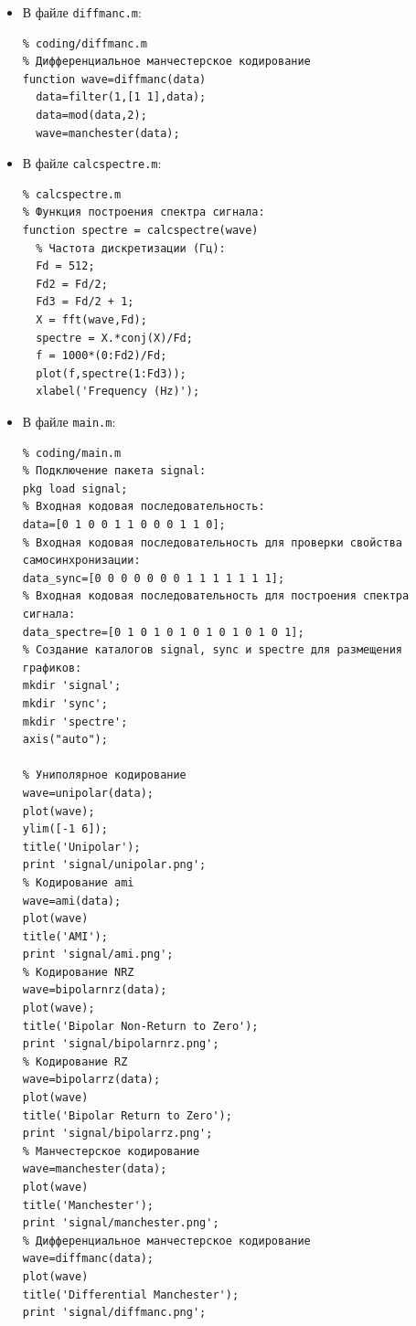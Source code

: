 \begin{enumerate}
\begin{itemize}
\begin{verbatim}
% coding/manchester.m
% Манчестерское кодирование:
function wave=manchester(data)
  data(data==0)=-1;
  data=upsample(data,2);
  data=filter([-1 1],1,data);
  wave=maptowave(data);
            \end{verbatim}
        \item В файле \texttt{diffmanc.m}:
            \begin{verbatim}
% coding/diffmanc.m
% Дифференциальное манчестерское кодирование
function wave=diffmanc(data)
  data=filter(1,[1 1],data);
  data=mod(data,2);
  wave=manchester(data);
            \end{verbatim}
        \item В файле \texttt{calcspectre.m}:
            \begin{verbatim}
% calcspectre.m
% Функция построения спектра сигнала:
function spectre = calcspectre(wave)
  % Частота дискретизации (Гц):
  Fd = 512;
  Fd2 = Fd/2;
  Fd3 = Fd/2 + 1;
  X = fft(wave,Fd);
  spectre = X.*conj(X)/Fd;
  f = 1000*(0:Fd2)/Fd;
  plot(f,spectre(1:Fd3));
  xlabel('Frequency (Hz)');
            \end{verbatim}
        \item В файле \texttt{main.m}:
            \begin{verbatim}
% coding/main.m
% Подключение пакета signal:
pkg load signal;
% Входная кодовая последовательность:
data=[0 1 0 0 1 1 0 0 0 1 1 0];
% Входная кодовая последовательность для проверки свойства самосинхронизации:
data_sync=[0 0 0 0 0 0 0 1 1 1 1 1 1 1];
% Входная кодовая последовательность для построения спектра сигнала:
data_spectre=[0 1 0 1 0 1 0 1 0 1 0 1 0 1];
% Создание каталогов signal, sync и spectre для размещения графиков:
mkdir 'signal';
mkdir 'sync';
mkdir 'spectre';
axis("auto");

% Униполярное кодирование
wave=unipolar(data);
plot(wave);
ylim([-1 6]);
title('Unipolar');
print 'signal/unipolar.png';
% Кодирование ami
wave=ami(data);
plot(wave)
title('AMI');
print 'signal/ami.png';
% Кодирование NRZ
wave=bipolarnrz(data);
plot(wave);
title('Bipolar Non-Return to Zero');
print 'signal/bipolarnrz.png';
% Кодирование RZ
wave=bipolarrz(data);
plot(wave)
title('Bipolar Return to Zero');
print 'signal/bipolarrz.png';
% Манчестерское кодирование
wave=manchester(data);
plot(wave)
title('Manchester');
print 'signal/manchester.png';
% Дифференциальное манчестерское кодирование
wave=diffmanc(data);
plot(wave)
title('Differential Manchester');
print 'signal/diffmanc.png';


\end{verbatim}
\end{itemize}
\end{enumerate}
